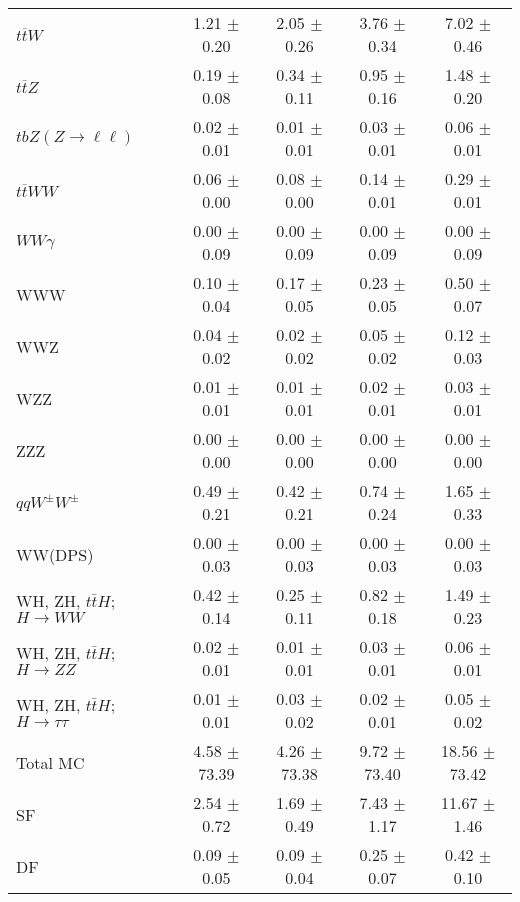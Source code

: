 \begin{tabular}{l|cccc}
                   $t\overline{t}W$ &  1.21 $\pm$  0.20 &  2.05 $\pm$  0.26 &  3.76 $\pm$  0.34 &  7.02 $\pm$  0.46 \\
                   $t\overline{t}Z$ &  0.19 $\pm$  0.08 &  0.34 $\pm$  0.11 &  0.95 $\pm$  0.16 &  1.48 $\pm$  0.20 \\
    $tbZ (Z \rightarrow \ell \ell)$ &  0.02 $\pm$  0.01 &  0.01 $\pm$  0.01 &  0.03 $\pm$  0.01 &  0.06 $\pm$  0.01 \\
                  $t\overline{t}WW$ &  0.06 $\pm$  0.00 &  0.08 $\pm$  0.00 &  0.14 $\pm$  0.01 &  0.29 $\pm$  0.01 \\
                         $WW\gamma$ &  0.00 $\pm$  0.09 &  0.00 $\pm$  0.09 &  0.00 $\pm$  0.09 &  0.00 $\pm$  0.09 \\
                                WWW &  0.10 $\pm$  0.04 &  0.17 $\pm$  0.05 &  0.23 $\pm$  0.05 &  0.50 $\pm$  0.07 \\
                                WWZ &  0.04 $\pm$  0.02 &  0.02 $\pm$  0.02 &  0.05 $\pm$  0.02 &  0.12 $\pm$  0.03 \\
                                WZZ &  0.01 $\pm$  0.01 &  0.01 $\pm$  0.01 &  0.02 $\pm$  0.01 &  0.03 $\pm$  0.01 \\
                                ZZZ &  0.00 $\pm$  0.00 &  0.00 $\pm$  0.00 &  0.00 $\pm$  0.00 &  0.00 $\pm$  0.00 \\
                 $qqW^{\pm}W^{\pm}$ &  0.49 $\pm$  0.21 &  0.42 $\pm$  0.21 &  0.74 $\pm$  0.24 &  1.65 $\pm$  0.33 \\
                            WW(DPS) &  0.00 $\pm$  0.03 &  0.00 $\pm$  0.03 &  0.00 $\pm$  0.03 &  0.00 $\pm$  0.03 \\
WH, ZH, $t\bar{t}H$; $H \rightarrow WW$ &  0.42 $\pm$  0.14 &  0.25 $\pm$  0.11 &  0.82 $\pm$  0.18 &  1.49 $\pm$  0.23 \\
WH, ZH, $t\bar{t}H$; $H \rightarrow ZZ$ &  0.02 $\pm$  0.01 &  0.01 $\pm$  0.01 &  0.03 $\pm$  0.01 &  0.06 $\pm$  0.01 \\
WH, ZH, $t\bar{t}H$; $H \rightarrow \tau\tau$ &  0.01 $\pm$  0.01 &  0.03 $\pm$  0.02 &  0.02 $\pm$  0.01 &  0.05 $\pm$  0.02 \\
\hline\hline
                           Total MC &  4.58 $\pm$ 73.39 &  4.26 $\pm$ 73.38 &  9.72 $\pm$ 73.40 & 18.56 $\pm$ 73.42 \\
\hline
                                 SF &  2.54 $\pm$  0.72 &  1.69 $\pm$  0.49 &  7.43 $\pm$  1.17 & 11.67 $\pm$  1.46 \\
                                 DF &  0.09 $\pm$  0.05 &  0.09 $\pm$  0.04 &  0.25 $\pm$  0.07 &  0.42 $\pm$  0.10 \\

\end{tabular}
